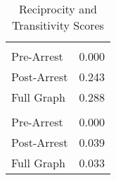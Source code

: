 \begin{table}[!h]

\caption{Reciprocity and Transitivity Scores}
\centering
\begin{tabular}[t]{lr}
\toprule
\addlinespace[0.3em]
\multicolumn{2}{l}{\textbf{Reciprocity}}\\
\hspace{1em}Pre-Arrest & \vphantom{1} 0.000\\
\hspace{1em}Post-Arrest & 0.243\\
\hspace{1em}Full Graph & 0.288\\
\addlinespace[0.3em]
\multicolumn{2}{l}{\textbf{Transitivity}}\\
\hspace{1em}Pre-Arrest & 0.000\\
\hspace{1em}Post-Arrest & 0.039\\
\hspace{1em}Full Graph & 0.033\\
\bottomrule
\end{tabular}
\end{table}
